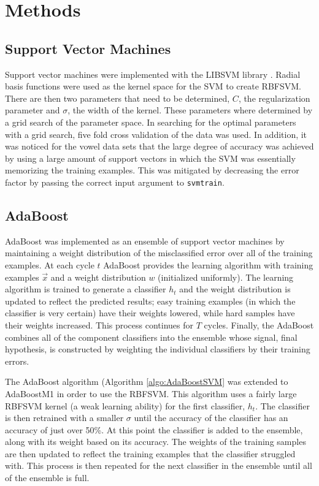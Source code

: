 \section{Methods}
\label{sec:Methods}

\subsection{Support Vector Machines}

Support vector machines were implemented with the LIBSVM library \cite{chang_libsvm:_2011}.
Radial basis functions were used as the kernel space for the SVM to create RBFSVM.
There are then two parameters that need to be determined, $C$, the regularization parameter and $\sigma$, the width of the kernel.
These parameters where determined by a grid search of the parameter space.
In searching for the optimal parameters with a grid search, five fold cross validation of the data was used.
In addition, it was noticed for the vowel data sets that the large degree of accuracy was achieved by using a large amount of support vectors in which the SVM was essentially memorizing the training examples.
This was mitigated by decreasing the error factor by passing the correct input argument to \verb+svmtrain+.

\subsection{AdaBoost}

AdaBoost was implemented as an ensemble of support vector machines by maintaining a weight distribution of the misclassified error over all of the training examples.
At each cycle $t$ AdaBoost provides the learning algorithm with training examples $\vec{x}$ and a weight distribution $w$ (initialized uniformly).
The learning algorithm is trained to generate a classifier $h_t$ and the weight distribution is updated to reflect the predicted results; easy training examples (in which the classifier is very certain) have their weights lowered, while hard samples have their weights increased.
This process continues for $T$ cycles.
Finally, the AdaBoost combines all of the component classifiers into the ensemble whose signal, final hypothesis, is constructed by weighting the individual classifiers by their training errors.

The AdaBoost algorithm (Algorithm \ref{algo:AdaBoostSVM} was extended to AdaBoostM1 in order to use the RBFSVM.
This algorithm uses a fairly large RBFSVM kernel (a weak learning ability) for the first classifier, $h_t$.
The classifier is then retrained with a smaller $\sigma$ until the accuracy of the classifier has an accuracy of just over 50\%.
At this point the classifier is added to the ensemble, along with its weight based on its accuracy.
The weights of the training samples are then updated to reflect the training examples that the classifier struggled with.
This process is then repeated for the next classifier in the ensemble until all of the ensemble is full.

